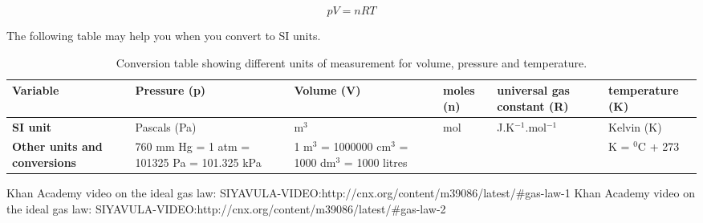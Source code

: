 \begin{equation*}
pV = nRT
\end{equation*}


The following table may help you when you convert to SI units.

\begin{table}[h]
\caption{Conversion table showing different units of measurement for volume, pressure and temperature.}
\label{tab:gas:units}
\begin{center}
\begin{tabular}{|p{2cm}|p{2cm}|p{2cm}|p{2cm}|p{2cm}|p{2cm}|}\hline
\textbf{Variable} & Pressure (\textbf{p}) & Volume (\textbf{V}) & moles (\textbf{n}) & universal gas constant (\textbf{R}) & temperature (\textbf{K})\\\hline
\textbf{SI unit} & Pascals (Pa) & m$^{3}$ & mol & J.K$^{-1}$.mol$^{-1}$ & Kelvin (K) \\\hline
\textbf{Other units and conversions} & 760 mm Hg = 1 atm = 101325 Pa = 101.325 kPa & 1 m$^{3}$ = 1000000 cm$^{3}$ = 1000 dm$^{3}$ = 1000 litres &  &  & K = $^{0}$C + 273 \\\hline
\end{tabular}
\end{center}
\end{table}
Khan Academy video on the ideal gas law: SIYAVULA-VIDEO:http://cnx.org/content/m39086/latest/#gas-law-1
Khan Academy video on the ideal gas law: SIYAVULA-VIDEO:http://cnx.org/content/m39086/latest/#gas-law-2

